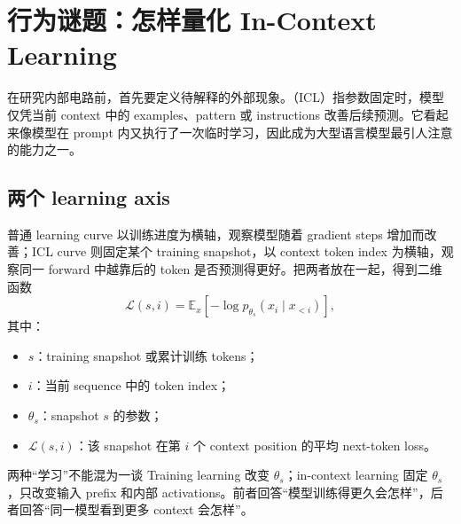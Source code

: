 \section{行为谜题：怎样量化 In-Context Learning}

在研究内部电路前，首先要定义待解释的外部现象。（ICL）指参数固定时，模型仅凭当前 context 中的 examples、pattern 或 instructions 改善后续预测。它看起来像模型在 prompt 内又执行了一次临时学习，因此成为大型语言模型最引人注意的能力之一。



\subsection{两个 learning axis}

普通 learning curve 以训练进度为横轴，观察模型随着 gradient steps 增加而改善；ICL curve 则固定某个 training snapshot，以 context token index 为横轴，观察同一 forward 中越靠后的 token 是否预测得更好。把两者放在一起，得到二维函数
\[
\mathcal{L}(s,i)
=\mathbb{E}_{x}\left[-\log p_{\theta_s}(x_i\mid x_{<i})\right],
\]
其中：
\begin{itemize}
  \item $s$：training snapshot 或累计训练 tokens；
  \item $i$：当前 sequence 中的 token index；
  \item $\theta_s$：snapshot $s$ 的参数；
  \item $\mathcal{L}(s,i)$：该 snapshot 在第 $i$ 个 context position 的平均 next-token loss。
\end{itemize}


\begin{importantbox}{两种“学习”不能混为一谈}
Training learning 改变 $\theta_s$；in-context learning 固定 $\theta_s$，只改变输入 prefix 和内部 activations。前者回答“模型训练得更久会怎样”，后者回答“同一模型看到更多 context 会怎样”。
\end{importantbox}

